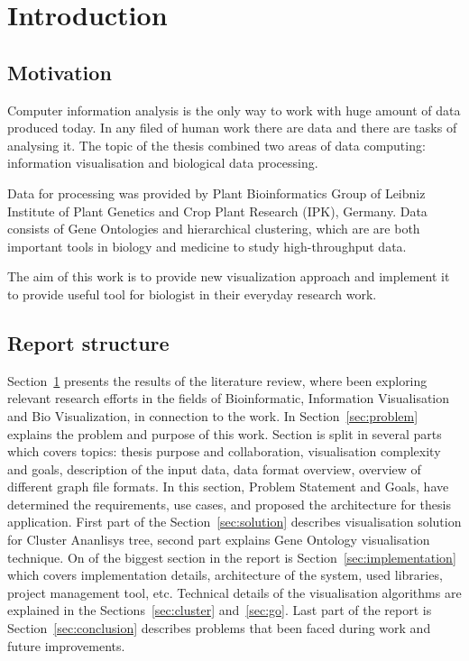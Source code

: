 \section{Introduction}
\label{sec:introduction}

\subsection{Motivation}
\label{sec:motivation}

Computer information analysis is the only way to work with huge amount of data produced today. In any filed of human work there are data and there are tasks of analysing it. The topic of the thesis combined two areas of data computing: information visualisation and biological data processing.

Data for processing was provided by Plant Bioinformatics Group of Leibniz Institute of Plant Genetics and Crop Plant Research (IPK), Germany. Data consists of Gene Ontologies and hierarchical clustering, which are are both important tools in biology and medicine to study high-throughput data.

The aim of this work is to provide new visualization approach and implement it to provide useful tool for biologist in their everyday research work.

\subsection{Report structure}
\label{sec:structure}

Section~\ref{sec:introduction} presents the results of the literature review, where been exploring relevant research efforts in the fields of Bioinformatic, Information Visualisation and Bio Visualization, in connection to the work. In Section~\ref{sec:problem} explains the problem and purpose of this work. Section is split in several parts which covers topics: thesis purpose and collaboration, visualisation complexity and goals, description of the input data, data format overview, overview of different graph file formats. In this section, Problem Statement and Goals, have determined the requirements, use cases, and proposed the architecture for thesis application. First part of the Section~\ref{sec:solution} describes visualisation solution for Cluster Ananlisys tree, second part explains Gene Ontology visualisation technique. On of the biggest section in the report is Section~\ref{sec:implementation} which covers implementation details, architecture of the system, used libraries, project management tool, etc. Technical details of the visualisation algorithms are explained in the Sections~\ref{sec:cluster} and~\ref{sec:go}. Last part of the report is Section~\ref{sec:conclusion} describes problems that been faced during work and future improvements.

